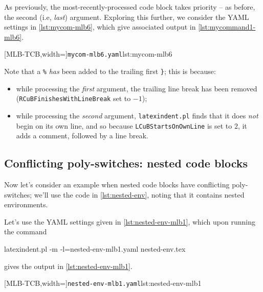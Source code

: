 	As previously, the most-recently-processed code block takes priority -- as before, the second (i.e, \emph{last}) argument. Exploring this
	further, we consider the YAML settings in \cref{lst:mycom-mlb6}, which give associated output in \cref{lst:mycommand1-mlb6}.

	\begin{minipage}{.4\linewidth}
	\end{minipage}
	\hfill
	\begin{minipage}{.55\linewidth}
		[MLB-TCB,width=\linewidth]{\texttt{mycom-mlb6.yaml}}{lst:mycom-mlb6}
	\end{minipage}

	Note that a \lstinline!%! \emph{has} been added to the trailing first \lstinline!}!; this is because:
	\begin{itemize}
		\item while processing the \emph{first} argument, the trailing line break has been removed (\texttt{RCuBFinishesWithLineBreak} set to $-1$);
		\item while processing the \emph{second} argument, \texttt{latexindent.pl} finds that it does \emph{not} begin on its own line, and so
		      because \texttt{LCuBStartsOnOwnLine} is set to $2$, it adds a comment, followed by a line break.
	\end{itemize}

\subsection{Conflicting poly-switches: nested code blocks}
	Now let's consider an example when nested code blocks have conflicting poly-switches; we'll use the code in \cref{lst:nested-env},
	noting that it contains nested environments.


	Let's use the YAML settings given in \cref{lst:nested-env-mlb1}, which upon running the command
	\begin{commandshell}
latexindent.pl -m -l=nested-env-mlb1.yaml nested-env.tex
        \end{commandshell}
	gives the output in \cref{lst:nested-env-mlb1}.

	\begin{minipage}{.45\linewidth}
	\end{minipage}
	\hfill
	\begin{minipage}{.55\linewidth}
		[MLB-TCB,width=\linewidth]{\texttt{nested-env-mlb1.yaml}}{lst:nested-env-mlb1}
	\end{minipage}


